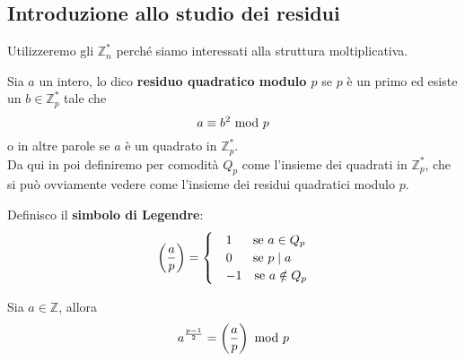 \subsection{Introduzione allo studio dei residui}
Utilizzeremo gli $\mathbb{Z}_n^*$ perché siamo interessati alla struttura moltiplicativa.
\begin{definizione} 
	Sia $a$ un intero, lo dico \textbf{residuo quadratico modulo $p$} se $p$ è un primo ed esiste un $b\in\mathbb{Z}_p^*$ tale che 
	\begin{equation*}
	a\equiv b^2\ \mathrm{mod}\ p
	\end{equation*}
	o in altre parole se $a$ è un quadrato in $\mathbb{Z}_p^*$. \\ Da qui in poi definiremo per comodità $Q_p$ come l'insieme dei quadrati in $\mathbb{Z}_p^*$, che si può ovviamente vedere come l'insieme dei residui quadratici modulo $p$.
\end{definizione}
\begin{definizione}
	Definisco il \textbf{simbolo di Legendre}:
	\begin{equation*}
	\left(\frac{a}{p}\right)= \begin{cases}
	&1 \ \ \ \ \  \text{se $a\in Q_p$}\\
	&0 \ \ \ \ \ \text{se $p\mid a$}\\
	&-1 \ \ \ \text{se $a\notin Q_p$}
	\end{cases}
	\end{equation*}
\end{definizione}
\begin{teorema} 
	Sia $a\in\mathbb{Z}$, allora
	\begin{equation*}
	a^{\frac{p-1}{2}}=\left(\frac{a}{p}\right)\ \mathrm{mod}\ p
	\end{equation*}
\end{teorema}
